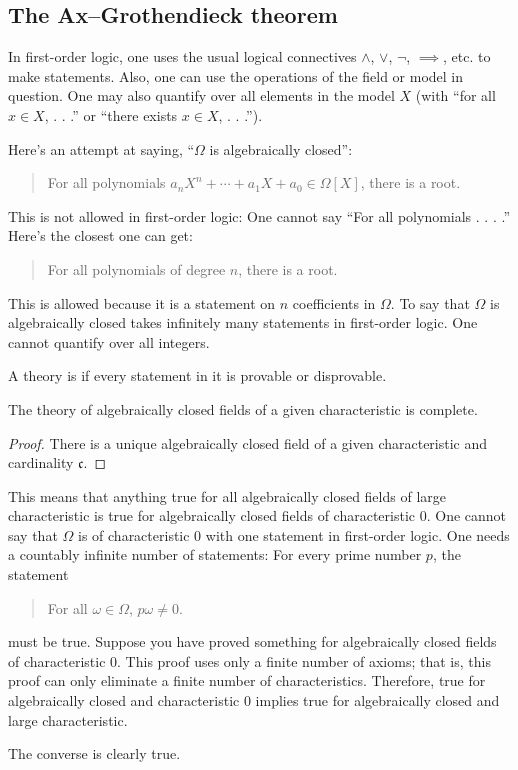 \documentclass [11 pt, oneside] {article}
\begin{document}
\subsection{The Ax--Grothendieck theorem}
\begin{remark}
	 In first-order logic, one uses the usual logical connectives $\land$, $\lor$, $\lnot$, $\implies$, etc. to make statements. Also, one can use the operations of the field or model in question. One may also quantify over all elements in the model $X$ (with ``for all $x\in X$, . . .'' or ``there exists $x\in X$, . . .'').

	Here's an attempt at saying, ``$\Omega$ is algebraically closed'':
	\begin{quote}
		\small 
		For all polynomials $a_nX^n + \cdots + a_1X + a_0\in \Omega[X]$, there is a root.
	\end{quote}
	This is not allowed in first-order logic: One cannot say ``For all polynomials . . . .'' Here's the closest one can get:
	\begin{quote}
		\small 
		For all polynomials of degree $n$, there is a root.
	\end{quote}
	This is allowed because it is a statement on $n$ coefficients in $\Omega$. To say that $\Omega$ is algebraically closed takes infinitely many statements in first-order logic. One cannot quantify over all integers.
\end{remark}
\begin{definition}[ ]\label{}
A theory is  if every statement in it is provable or disprovable.
\end{definition}

\begin{proposition}[ ]\label{}
The theory of algebraically closed fields of a given characteristic is complete.
\end{proposition}

\begin{proof}
There is a unique algebraically closed field of a given characteristic and cardinality $\mathfrak{c}$.
\end{proof}

\begin{remark}
	This means that anything true for all algebraically closed fields of large characteristic is true for algebraically closed fields of characteristic $0$. One cannot say that $\Omega$ is of characteristic $0$ with one statement in first-order logic. One needs a countably infinite number of statements: For every prime number $p$, the statement
	\begin{quote}
		\small 
		For all $\omega\in \Omega$, $p\omega\ne 0$.
	\end{quote}
	must be true. Suppose you have proved something for algebraically closed fields of characteristic $0$. This proof uses only a finite number of axioms; that is, this proof can only eliminate a finite number of characteristics. Therefore, true for algebraically closed and characteristic $0$ implies true for algebraically closed and large characteristic.

	The converse is clearly true.
\end{remark}
\end{document}

